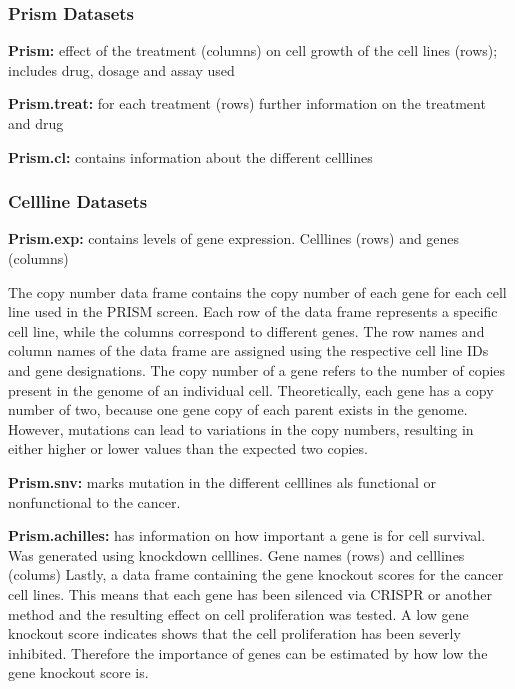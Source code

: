 \documentclass[
  11pt,
]{article}
\begin{document}
\hypertarget{prism-datasets}{%
\subsubsection{Prism Datasets}\label{prism-datasets}}

\textbf{Prism:} effect of the treatment (columns) on cell growth of the
cell lines (rows); includes drug, dosage and assay used

\textbf{Prism.treat:} for each treatment (rows) further information on
the treatment and drug

\textbf{Prism.cl:} contains information about the different celllines

\hypertarget{cellline-datasets}{%
\subsubsection{Cellline Datasets}\label{cellline-datasets}}

\textbf{Prism.exp:} contains levels of gene expression. Celllines (rows)
and genes (columns)

The copy number data frame contains the copy number of each gene for
each cell line used in the PRISM screen. Each row of the data frame
represents a specific cell line, while the columns correspond to
different genes. The row names and column names of the data frame are
assigned using the respective cell line IDs and gene designations. The
copy number of a gene refers to the number of copies present in the
genome of an individual cell. Theoretically, each gene has a copy number
of two, because one gene copy of each parent exists in the genome.
However, mutations can lead to variations in the copy numbers, resulting
in either higher or lower values than the expected two copies.

\textbf{Prism.snv:} marks mutation in the different celllines als
functional or nonfunctional to the cancer.

\textbf{Prism.achilles:} has information on how important a gene is for
cell survival. Was generated using knockdown celllines. Gene names
(rows) and celllines (colums) Lastly, a data frame containing the gene
knockout scores for the cancer cell lines. This means that each gene has
been silenced via CRISPR or another method and the resulting effect on
cell proliferation was tested. A low gene knockout score indicates shows
that the cell proliferation has been severly inhibited. Therefore the
importance of genes can be estimated by how low the gene knockout score
is.
\end{document}
